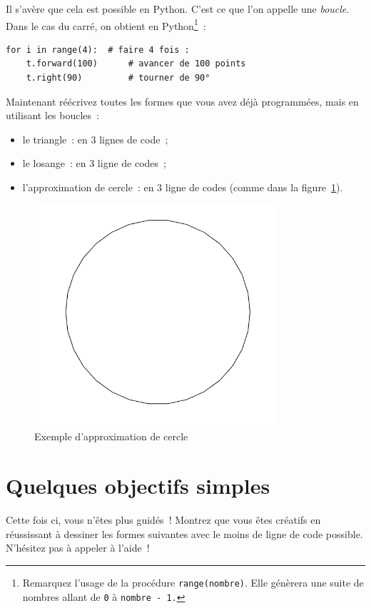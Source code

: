 \documentclass[11pt,a4paper]{article}
\begin{document}
Il s'avère que cela est possible en Python. C'est ce que l'on appelle une
\emph{boucle}. Dans le cas du carré, on obtient en Python\footnote{Remarquez
l'usage de la procédure \lstinline{range(nombre)}. Elle génèrera une suite de
nombres allant de \lstinline{0} à \lstinline{nombre - 1.}}~:

\begin{lstlisting}
for i in range(4):  # faire 4 fois :
    t.forward(100)      # avancer de 100 points
    t.right(90)         # tourner de 90°
\end{lstlisting}

Maintenant réécrivez toutes les formes que vous avez déjà programmées, mais en
utilisant les boucles~:

\begin{itemize}
\item le triangle~: en 3 lignes de code~;
\item le losange~: en 3 ligne de codes~;
\item l'approximation de cercle~: en 3 ligne de codes (comme dans la
    figure~\ref{fig:circle}).
\end{itemize}

\begin{figure}
    \centering
    \includegraphics[width=0.8\textwidth]{img/approx_circle}
    \caption{Exemple d'approximation de cercle}
    \label{fig:circle}
\end{figure}

\section{Quelques objectifs simples}
Cette fois ci, vous n'êtes plus guidés~! Montrez que vous êtes créatifs en
réussissant à dessiner les formes suivantes avec le moins de ligne de code
possible. N'hésitez pas à appeler à l'aide~!
\end{document}
